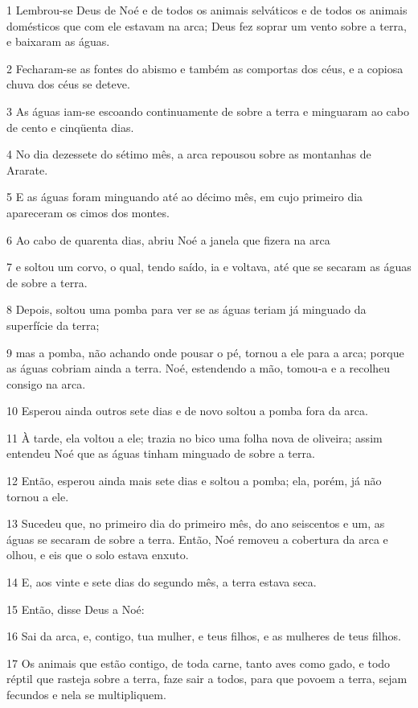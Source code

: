 \par 1 Lembrou-se Deus de Noé e de todos os animais selváticos e de todos os animais domésticos que com ele estavam na arca; Deus fez soprar um vento sobre a terra, e baixaram as águas.
\par 2 Fecharam-se as fontes do abismo e também as comportas dos céus, e a copiosa chuva dos céus se deteve.
\par 3 As águas iam-se escoando continuamente de sobre a terra e minguaram ao cabo de cento e cinqüenta dias.
\par 4 No dia dezessete do sétimo mês, a arca repousou sobre as montanhas de Ararate.
\par 5 E as águas foram minguando até ao décimo mês, em cujo primeiro dia apareceram os cimos dos montes.
\par 6 Ao cabo de quarenta dias, abriu Noé a janela que fizera na arca
\par 7 e soltou um corvo, o qual, tendo saído, ia e voltava, até que se secaram as águas de sobre a terra.
\par 8 Depois, soltou uma pomba para ver se as águas teriam já minguado da superfície da terra;
\par 9 mas a pomba, não achando onde pousar o pé, tornou a ele para a arca; porque as águas cobriam ainda a terra. Noé, estendendo a mão, tomou-a e a recolheu consigo na arca.
\par 10 Esperou ainda outros sete dias e de novo soltou a pomba fora da arca.
\par 11 À tarde, ela voltou a ele; trazia no bico uma folha nova de oliveira; assim entendeu Noé que as águas tinham minguado de sobre a terra.
\par 12 Então, esperou ainda mais sete dias e soltou a pomba; ela, porém, já não tornou a ele.
\par 13 Sucedeu que, no primeiro dia do primeiro mês, do ano seiscentos e um, as águas se secaram de sobre a terra. Então, Noé removeu a cobertura da arca e olhou, e eis que o solo estava enxuto.
\par 14 E, aos vinte e sete dias do segundo mês, a terra estava seca.
\par 15 Então, disse Deus a Noé:
\par 16 Sai da arca, e, contigo, tua mulher, e teus filhos, e as mulheres de teus filhos.
\par 17 Os animais que estão contigo, de toda carne, tanto aves como gado, e todo réptil que rasteja sobre a terra, faze sair a todos, para que povoem a terra, sejam fecundos e nela se multipliquem.
